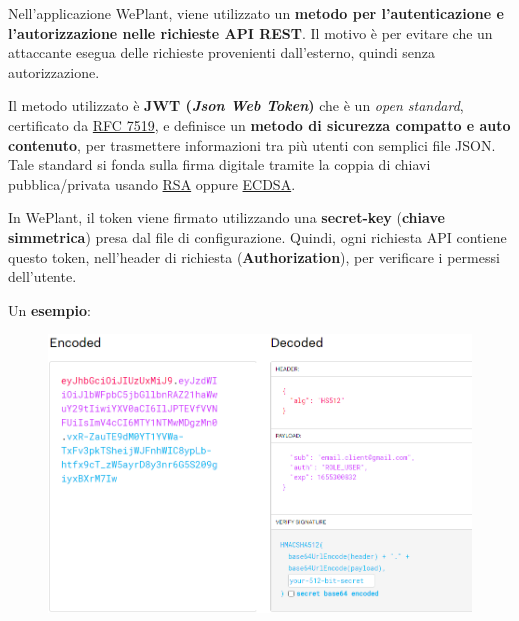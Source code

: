 \documentclass[a4paper]{article}
\begin{document}
	Nell'applicazione WePlant, viene utilizzato un \textbf{metodo per l'autenticazione e l'autorizzazione nelle richieste API REST}. Il motivo è per evitare che un attaccante esegua delle richieste provenienti dall'esterno, quindi senza autorizzazione.\newline
	
	\noindent
	Il metodo utilizzato è \textbf{JWT (\emph{Json Web Token})} che è un \emph{open standard}, certificato da \href{https://datatracker.ietf.org/doc/html/rfc7519}{RFC 7519}, e definisce un \textbf{metodo di sicurezza compatto e auto contenuto}, per trasmettere informazioni tra più utenti con semplici file JSON. Tale standard si fonda sulla firma digitale tramite la coppia di chiavi pubblica/privata usando
	\href{https://en.wikipedia.org/wiki/RSA_(cryptosystem)}{RSA} oppure \href{https://it.wikipedia.org/wiki/Elliptic_Curve_Digital_Signature_Algorithm}{ECDSA}.\newline
	
	\noindent
	In WePlant, il token viene firmato utilizzando una \textbf{secret-key} (\textbf{chiave simmetrica}) presa dal file di configurazione. Quindi, ogni richiesta API contiene questo token, nell'header di richiesta (\textbf{Authorization}), per verificare i permessi dell'utente.\newline
	
	\noindent
	Un \textcolor{Green4}{\textbf{esempio}}:
	\begin{figure}[!htp]
		\centering
		\includegraphics[width=\textwidth]{img/we-plant/jwt.png}
	\end{figure}\newpage
	
\end{document}
